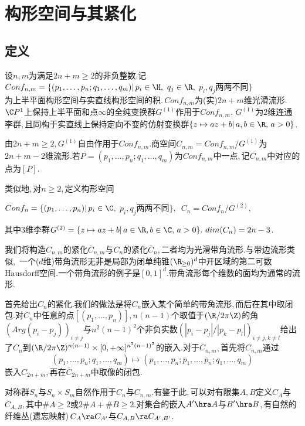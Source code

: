\chapter{构形空间与其紧化}

\section{定义}

 设$n,m$为满足$2n+m\ge 2$的非负整数.记\\
 $Conf_{n,m}=
\{(p_1,\dots,p_n;q_1,\dots,q_m)|\, p_i\in\H,\,\,q_j \in 
   \R,$\,\,$p_i, q_j$两两不同$\}$\\
为上半平面构形空间与实直线构形空间的积.\,$Conf_{n,m}$为(实)$2n+m$维光滑流形.\,$\C P^1$上保持上半平面和点$\infty$的全纯变换群$G^{(1)}$作用于$Conf_{n,m}$.\,\,$G^{(1)}$为$2$维连通李群,\,且同构于实直线上保持定向不变的仿射变换群$\{z\mapsto az+b| \,a,b\in \R, \,a>0\}$.

由$2n+m\ge 2$,\,$G^{(1)}$自由作用于$Conf_{n,m}$.商空间$C_{n,m}=Conf_{n,m}/G^{(1)}$为$2n+m-2$维流形.若$P=(p_1,\dots,p_n;q_1,\dots,q_m)$为$Conf_{n,m}$中一点,\,记$C_{n,m}$中对应的点为$[P]$.

类似地,\,对$n\ge 2$,\,定义构形空间\begin{center}
$Conf_n=\{(p_1,\dots,p_n)|\,p_i\in \C,$\,\,$p_i, q_j$两两不同$\},\,\,\,C_n=Conf_n/G^{(2)},$\\
\end{center}
其中$3$维李群$G^{(2)}=\{z\mapsto az+b|\, a\in \R, b \in \C, \,a>0\}.\,\,dim(C_n)=2n-3$.

我们将构造$C_{n,m}$的紧化${\overline C}_{n,m}$与$C_n$的紧化${\overline C}_n$,\,二者均为光滑带角流形.与带边流形类似,\,
一个($d$维)带角流形无非是局部为闭单纯锥$(\R_{\ge 0})^d$中开区域的第二可数Hausdorff空间.一个带角流形的例子是$[0,1]^d$.带角流形每个维数的面均为通常的流形.

首先给出${C}_{n}$的紧化.我们的做法是将$C_{n}$嵌入某个简单的带角流形,\,而后在其中取闭包.对$C_{n}$中任意的点$[(p_1,\dots,p_n)]$,\,$n(n-1)$个取值于$(\R /2\pi \Z)$的角$\left(Arg(p_i-p_j)\right)_{i\neq j}$与$n^2(n-1)^2$个非负实数$(|p_i-p_j|/|p_k-p_l|)_{i\neq j, k\neq l}$给出了$C_{n}$到$(\R /2\pi \Z)^{n(n-1)}\times [0,+\infty ]^{n^2(n-1)^2}$的嵌入.对于$\overline C_{n,m}$,\,首先将$C_{n,m}$通过
$$(p_1,\dots,p_n;q_1,\dots,q_m)\mapsto (p_1,\dots,p_n;\overline p_1,\dots,\overline p_n;q_1,\dots,q_m)$$
嵌入$C_{2n+m}$,\,再在$\overline C_{2n+m}$中取像的闭包.

对称群$S_n$与$S_n\times S_m$自然作用于$C_n$与$C_{n,m}$.有鉴于此,\,可以对有限集$A,B$定义$C_A$与$C_{A,B}$,\,其中$\#A\ge 2$或$2\#A+\#B\ge 2$.对集合的嵌入$A'\hra A$与$B'\hra B$,\,有自然的纤维丛(遗忘映射)\,$C_A\ra C_{A'}$与$C_{A,B}\ra C_{A',B'}$.



